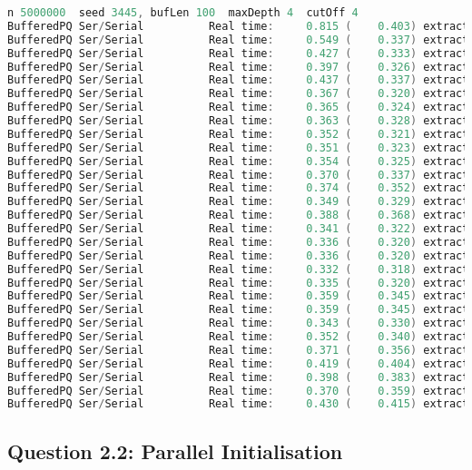 \documentclass[format=acmsmall, review=false, screen=true]{acmart}
\begin{document}
\begin{lstlisting}[language=java]
n 5000000  seed 3445, bufLen 100  maxDepth 4  cutOff 4
BufferedPQ Ser/Serial          Real time:     0.815 (    0.403) extract: 5000000
BufferedPQ Ser/Serial          Real time:     0.549 (    0.337) extract: 2500000
BufferedPQ Ser/Serial          Real time:     0.427 (    0.333) extract: 1666666
BufferedPQ Ser/Serial          Real time:     0.397 (    0.326) extract: 1250000
BufferedPQ Ser/Serial          Real time:     0.437 (    0.337) extract: 1000000
BufferedPQ Ser/Serial          Real time:     0.367 (    0.320) extract: 833333
BufferedPQ Ser/Serial          Real time:     0.365 (    0.324) extract: 714285
BufferedPQ Ser/Serial          Real time:     0.363 (    0.328) extract: 625000
BufferedPQ Ser/Serial          Real time:     0.352 (    0.321) extract: 555555
BufferedPQ Ser/Serial          Real time:     0.351 (    0.323) extract: 500000
BufferedPQ Ser/Serial          Real time:     0.354 (    0.325) extract: 454545
BufferedPQ Ser/Serial          Real time:     0.370 (    0.337) extract: 416666
BufferedPQ Ser/Serial          Real time:     0.374 (    0.352) extract: 384615
BufferedPQ Ser/Serial          Real time:     0.349 (    0.329) extract: 357142
BufferedPQ Ser/Serial          Real time:     0.388 (    0.368) extract: 333333
BufferedPQ Ser/Serial          Real time:     0.341 (    0.322) extract: 312500
BufferedPQ Ser/Serial          Real time:     0.336 (    0.320) extract: 294117
BufferedPQ Ser/Serial          Real time:     0.336 (    0.320) extract: 277777
BufferedPQ Ser/Serial          Real time:     0.332 (    0.318) extract: 263157
BufferedPQ Ser/Serial          Real time:     0.335 (    0.320) extract: 250000
BufferedPQ Ser/Serial          Real time:     0.359 (    0.345) extract: 238095
BufferedPQ Ser/Serial          Real time:     0.359 (    0.345) extract: 227272
BufferedPQ Ser/Serial          Real time:     0.343 (    0.330) extract: 217391
BufferedPQ Ser/Serial          Real time:     0.352 (    0.340) extract: 208333
BufferedPQ Ser/Serial          Real time:     0.371 (    0.356) extract: 200000
BufferedPQ Ser/Serial          Real time:     0.419 (    0.404) extract: 192307
BufferedPQ Ser/Serial          Real time:     0.398 (    0.383) extract: 185185
BufferedPQ Ser/Serial          Real time:     0.370 (    0.359) extract: 178571
BufferedPQ Ser/Serial          Real time:     0.430 (    0.415) extract: 172413
\end{lstlisting}

\subsection{Question 2.2: Parallel Initialisation}
\end{document}
